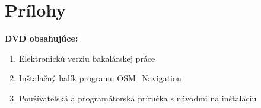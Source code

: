 \chapter*{Prílohy}

\textbf{DVD obsahujúce:}
\begin{enumerate}
\item Elektronickú verziu bakalárskej práce
\item Inštalačný balík programu OSM\_Navigation
\item Používateľská a programátorská príručka s návodmi na inštaláciu
\end{enumerate}



    
    
